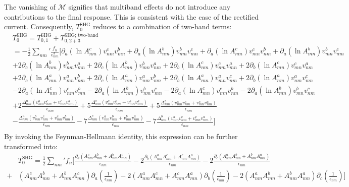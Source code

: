 \documentclass[twocolumn, prx, reprint, amsfonts, amsmath, amssymb, longbibliography, floatfix, aps]{revtex4-2}
\begin{document}
The vanishing of $\mathcal{M}$ signifies that multiband effects do not introduce any contributions to the final response. This is consistent with the case of the rectified current. Consequently, $T^{\text{SHG}}_0$ reduces to a combination of two-band terms:
\begin{equation}
	\begin{aligned}
		&T^{\text{SHG}}_{0} = T^{\text{SHG}}_{0, 1} + T^{\text{SHG; two-band}}_{0, 2+3} \\
		&=- \frac{1}{2} {\textstyle \sum_{nm}'} \frac{f_n}{\epsilon^3_{nm}}\Big[\partial_a(\ln A^{c}_{nm}) v^c_{nm} v^{b}_{mn} + \partial_a(\ln A^{b}_{nm}) v^b_{nm} v^{c}_{mn} + \partial_a(\ln A^{c}_{mn}) v^c_{mn} v^{b}_{nm} + \partial_a(\ln A^{b}_{mn}) v^b_{mn} v^{c}_{nm} \\
		&+ 2\partial_c(\ln A^{b}_{nm}) v^b_{nm} v^{a}_{mn} + 2\partial_c(\ln A^{b}_{mn}) v^b_{mn} v^{a}_{nm} + 2\partial_b(\ln A^{c}_{nm}) v^c_{nm} v^{a}_{mn} + 2\partial_b(\ln A^{c}_{mn}) v^c_{mn} v^{a}_{nm}\\
		&+2\partial_c(\ln A^{a}_{mn}) v^a_{mn} v^{b}_{nm} + 2\partial_c(\ln A^{a}_{nm}) v^a_{nm} v^{b}_{mn} + 2\partial_b(\ln A^{a}_{mn}) v^a_{mn} v^{c}_{nm} + 2\partial_b(\ln A^{a}_{nm}) v^a_{nm} v^{c}_{mn} \\
		&-2\partial_a(\ln A^{c}_{nm}) v^c_{nm} v^{b}_{mn} - 2\partial_a(\ln A^{b}_{nm}) v^b_{nm} v^{c}_{mn} - 2\partial_a(\ln A^{c}_{mn}) v^c_{mn} v^{b}_{nm} - 2\partial_a(\ln A^{b}_{mn}) v^b_{mn} v^{c}_{nm} \\
		& + 2\frac{\Delta_{nm}^a (v^b_{mn}v^c_{nm} + v^c_{mn}v^b_{nm})}{\epsilon_{nm}} + 5\frac{\Delta_{nm}^c (v^a_{mn}v^b_{nm} + v^b_{mn}v^a_{nm})}{\epsilon_{nm}} + 5\frac{\Delta_{nm}^b (v^a_{mn}v^c_{nm} + v^c_{mn}v^a_{nm})}{\epsilon_{nm}} \\
		&-\frac{\Delta_{nm}^a (v^b_{mn}v^c_{nm} + v^c_{mn}v^b_{nm})}{\epsilon_{nm}} - 7\frac{\Delta_{nm}^c (v^a_{mn}v^b_{nm} + v^b_{mn}v^a_{nm})}{\epsilon_{nm}} - 7\frac{\Delta_{nm}^b (v^a_{mn}v^c_{nm} + v^c_{mn}v^a_{nm})}{\epsilon_{nm}} \Big]\\
	\end{aligned}
\end{equation}
By invoking the Feynman-Hellmann identity, this expression can be further transformed into:
\begin{equation}
	\begin{aligned}
		&T^{\text{SHG}}_{0} 
		= \frac{1}{2} {\textstyle \sum_{nm}'} f_n \Big[\frac{\partial_{a}(A^{c}_{nm}A^{b}_{mn} + A^{b}_{nm}A^{c}_{mn})}{\epsilon_{nm}} -2 \frac{\partial_{b}(A^{a}_{nm}A^{c}_{mn} + A^{c}_{nm}A^{a}_{mn})}{\epsilon_{nm}}  -2 \frac{\partial_{c}(A^{a}_{nm}A^{b}_{mn} + A^{b}_{nm}A^{a}_{mn})}{\epsilon_{nm}} \\
		+& (A^{c}_{nm}A^{b}_{mn} + A^{b}_{nm}A^{c}_{mn}) \partial_a(\frac{1}{\epsilon_{nm}}) - 2(A^{a}_{nm}A^{c}_{mn} + A^{c}_{nm}A^{a}_{mn})\partial_b(\frac{1}{\epsilon_{nm}}) - 2(A^{a}_{nm}A^{b}_{mn} + A^{b}_{nm}A^{a}_{mn})\partial_c(\frac{1}{\epsilon_{nm}})\Big] \\
	\end{aligned}
\end{equation}
\end{document}
